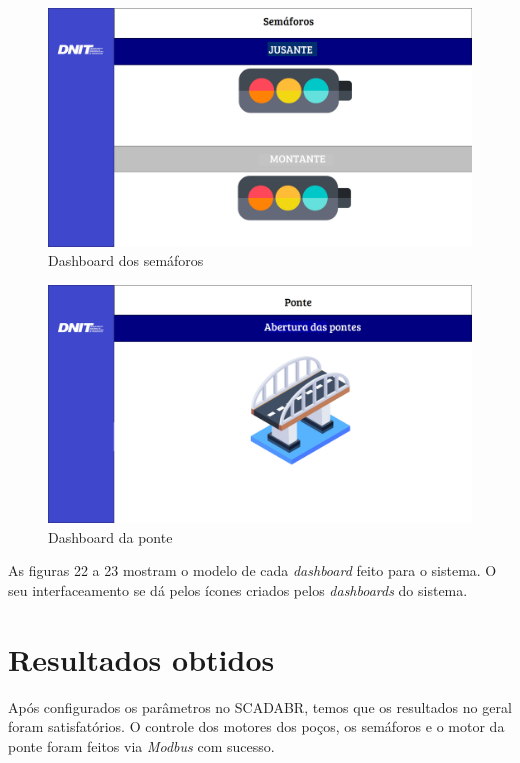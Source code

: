 \begin{figure}[h]
	\centering
	\label{fig:sem_scada}
		\includegraphics[keepaspectratio=true,scale=0.2]{figuras/Semáforos.png}
	\caption{Dashboard dos semáforos}
\end{figure}

\begin{figure}[h]
	\centering
	\label{fig:ponte_scada}
		\includegraphics[keepaspectratio=true,scale=0.2]{figuras/Ponte_fim.png}
	\caption{Dashboard da ponte}
\end{figure}


As figuras 22 a 23 mostram o modelo de cada \textit{dashboard} feito para o sistema. O seu interfaceamento se dá pelos ícones criados pelos \textit{dashboards} do sistema. 

\section{Resultados obtidos}

Após configurados os parâmetros no SCADABR, temos que os resultados no geral foram satisfatórios. O controle dos motores dos poços, os semáforos e o motor da ponte foram feitos via \textit{Modbus} com sucesso.

